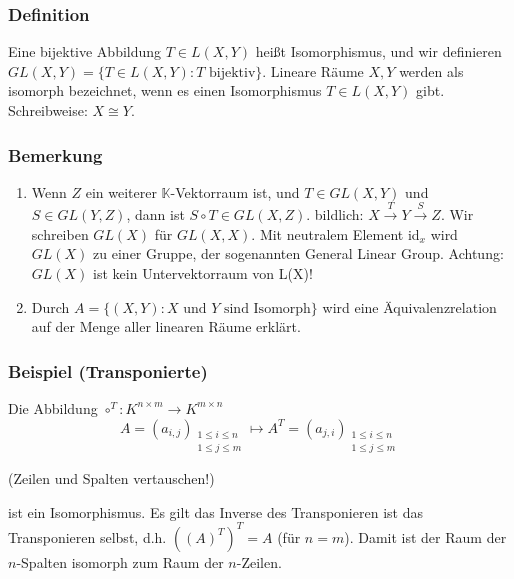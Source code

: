 \subsubsection{Definition}
Eine bijektive Abbildung $T\in L(X,Y)$ heißt Isomorphismus, und wir definieren $GL(X,Y)=\{T\in L(X,Y):T\text{ bijektiv}\}$.  Lineare Räume $X, Y$ werden als isomorph bezeichnet, wenn es einen Isomorphismus $T\in L(X,Y)$ gibt.  Schreibweise: $X\cong Y$.
\subsubsection{Bemerkung}
\begin{enumerate}
\item Wenn $Z$ ein weiterer $\mathbb{K}$-Vektorraum ist, und $T\in GL(X,Y)$ und $S\in GL(Y,Z)$, dann ist $S\circ T\in GL(X,Z)$. bildlich: $X\stackrel{T}{\rightarrow}Y\stackrel{S}{\rightarrow}Z$.  Wir schreiben $GL(X)$ für $GL(X,X)$.  Mit neutralem Element id$_x$ wird $GL(X)$ zu einer Gruppe, der sogenannten General Linear Group.  Achtung: $GL(X)$ ist kein Untervektorraum von L(X)!
\item Durch $A=\{(X,Y): X\text{ und } Y\text{ sind Isomorph}\}$ wird eine Äquivalenzrelation auf der Menge aller linearen Räume erklärt.
\end{enumerate}
\subsubsection{Beispiel (Transponierte)}
Die Abbildung $\circ ^T:K^{n\times m}\rightarrow K^{m\times n}$
\[ A=(a_{i,j})_{\substack{1\leq i\leq n\\ 1\leq j\leq m}} \mapsto A^T =(a_{j,i})_{\substack{1\leq i\leq n\\ 1\leq j\leq m}}\]
\begin{center}
(Zeilen und Spalten vertauschen!)
\end{center}
ist ein Isomorphismus.  Es gilt das Inverse des Transponieren ist das Transponieren selbst, d.h. $((A)^T)^T=A$ (für $n=m$).  Damit ist der Raum der $n$-Spalten isomorph zum Raum der $n$-Zeilen.

